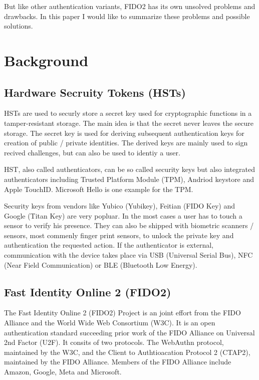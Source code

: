 \documentclass[runningheads]{llncs}
\begin{document}
But like other authentication variants, FIDO2 has its own unsolved problems and drawbacks. In this paper I would like to summarize these problems and possible solutions. 

\section{Background}
\subsection{Hardware Secruity Tokens (HSTs)}
HSTs are used to securly store a secret key used for cryptographic functions in a tamper-resistant storage. The main idea is that the secret never leaves the secure storage. The secret key is used for deriving subsequent authentication keys for creation of public / private identities. The derived keys are mainly used to sign recived challenges, but can also be used to identiy a user.\cite{272198}

HST, also called authenticators, can be so called security keys but also integrated authenticators including Trusted Platform Module (TPM), Andriod keystore and Apple TouchID. Microsoft Hello is one example for the TPM.

Security keys from vendors like Yubico (Yubikey), Feitian (FIDO Key) and Google (Titan Key) are very popluar. In the most cases a user has to touch a sensor to verify his presence. They can also be shipped with biometric scanners / sensors, most commenly finger print sensors, to unlock the private key and authentication the requested action. If the authenticator is external, communication with the device takes place via USB (Universal Serial Bus), NFC (Near Field Communication) or BLE (Bluetooth Low Energy).\cite{9152694}

\subsection{Fast Identity Online 2 (FIDO2)}
The Fast Identity Online 2 (FIDO2) Project is an joint effort from the FIDO Alliance and the World Wide Web Consortium (W3C). It is an open authentication standard succeeding prior work of the FIDO Alliance on Universal 2nd Factor (U2F). \cite{9152694}  It consits of two protocols. The WebAuthn protocol, maintained by the W3C, and the Client to Authtioacation Protocol 2 (CTAP2), maintained by the FIDO Alliance. Members of the FIDO Alliance include Amazon, Google, Meta and Microsoft.
\end{document}
